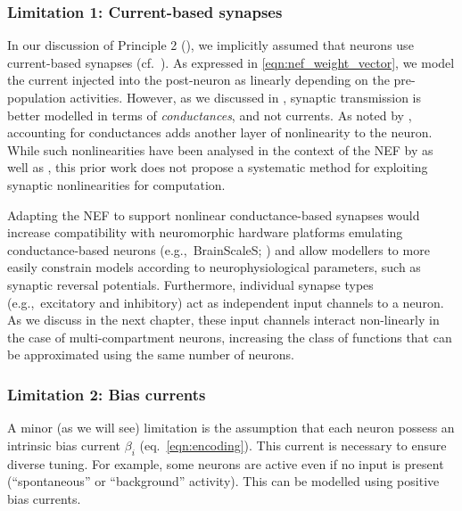 
\subsubsection{Limitation 1: Current-based synapses}
In our discussion of Principle 2 (), we implicitly assumed that neurons use current-based synapses (cf.~).
As expressed in \cref{eqn:nef_weight_vector}, we model the current injected into the post-neuron as linearly depending on the pre-population activities.
However, as we discussed in , synaptic transmission is better modelled in terms of \emph{conductances}, and not currents.
As noted by \citet[Section~2.1.2, p.~35]{eliasmith2003neural}, accounting for conductances adds another layer of nonlinearity to the neuron.
While such nonlinearities have been analysed in the context of the NEF by \citet[Chapter~4]{tripp2009search} as well as \citet{bobier2014unifying}, this prior work does not propose a systematic method for exploiting synaptic nonlinearities for computation.

Adapting the NEF to support nonlinear conductance-based synapses would increase compatibility with neuromorphic hardware platforms emulating conductance-based neurons (e.g.,~BrainScaleS; \cite{schemmel2010waferscale}) and allow modellers to more easily constrain models according to neurophysiological parameters, such as synaptic reversal potentials.
Furthermore, individual synapse types (e.g.,~excitatory and inhibitory) act as independent input channels to a neuron.
As we discuss in the next chapter, these input channels interact non-linearly in the case of multi-compartment neurons, increasing the class of functions that can be approximated using the same number of neurons.


\subsubsection{Limitation 2: Bias currents}
A minor (as we will see) limitation is the assumption that each neuron possess an intrinsic bias current $\beta_i$ (eq.~\ref{eqn:encoding}).
This current is necessary to ensure diverse tuning.
For example, some neurons are active even if no input is present (\enquote{spontaneous} or \enquote{background} activity).
This can be modelled using positive bias currents.

